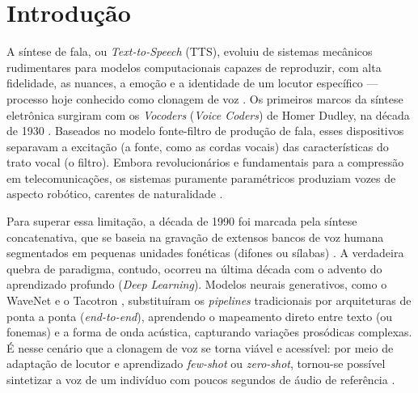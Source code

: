 \documentclass[12pt,a4paper]{article}
\begin{document}
\newpage
\tableofcontents
\newpage
\section{Introdução}
\label{sec:introducao}

A síntese de fala, ou \textit{Text-to-Speech} (TTS), evoluiu de sistemas
mecânicos rudimentares para modelos computacionais capazes de reproduzir, com
alta fidelidade, as nuances, a emoção e a identidade de um locutor específico
--- processo hoje conhecido como clonagem de voz \cite{jia2018}. Os primeiros
marcos da síntese eletrônica surgiram com os \textit{Vocoders} (\textit{Voice
Coders}) de Homer Dudley, na década de 1930 \cite{dudley1939}. Baseados no modelo
fonte-filtro de produção de fala, esses dispositivos separavam a excitação (a
fonte, como as cordas vocais) das características do trato vocal (o filtro).
Embora revolucionários e fundamentais para a compressão em telecomunicações, os
sistemas puramente paramétricos produziam vozes de aspecto robótico, carentes de
naturalidade \cite{klatt1987}.

Para superar essa limitação, a década de 1990 foi marcada pela síntese
concatenativa, que se baseia na gravação de extensos bancos de voz humana
segmentados em pequenas unidades fonéticas (difones ou sílabas)
\cite{hunt1996}. A verdadeira quebra de paradigma, contudo, ocorreu na última
década com o advento do aprendizado profundo (\textit{Deep Learning}). Modelos
neurais generativos, como o WaveNet \cite{oord2016wavenet} e o Tacotron
\cite{wang2017}, substituíram os \textit{pipelines} tradicionais por
arquiteturas de ponta a ponta (\textit{end-to-end}), aprendendo o mapeamento
direto entre texto (ou fonemas) e a forma de onda acústica, capturando variações
prosódicas complexas. É nesse cenário que a clonagem de voz se torna viável e
acessível: por meio de adaptação de locutor e aprendizado \textit{few-shot} ou
\textit{zero-shot}, tornou-se possível sintetizar a voz de um indivíduo com
poucos segundos de áudio de referência \cite{jia2018, wang2023vall}.
\end{document}
